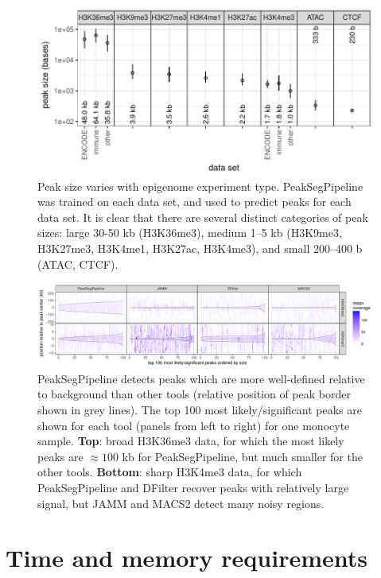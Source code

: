 \documentclass{article}
\begin{document}
\begin{figure}
  \centering
  \includegraphics[width=\textwidth]{figure-compare-size-panels.pdf}
  \vskip -0.5cm
  \caption{Peak size varies with epigenome experiment
    type. PeakSegPipeline was trained on each data set, and used to
    predict peaks for each data set. It is clear that there are
    several distinct categories of peak sizes: large 30-50 kb
    (H3K36me3), medium 1--5 kb (H3K9me3, H3K27me3, H3K4me1, H3K27ac,
    H3K4me3), and small 200--400 b (ATAC, CTCF).}
\end{figure}

\begin{figure}
  \centering
  \includegraphics[width=\textwidth]{figure-top100-absolute.pdf}
  \vskip -0.5cm
  \caption{PeakSegPipeline detects peaks which are more well-defined
    relative to background than other tools (relative position of peak
    border shown in grey lines). The top 100 most likely/significant
    peaks are shown for each tool (panels from left to right) for one
    monocyte sample.  \textbf{Top}: broad H3K36me3 data, for which the
    most likely peaks are $\approx 100$ kb for PeakSegPipeline, but
    much smaller for the other tools. \textbf{Bottom}: sharp H3K4me3
    data, for which PeakSegPipeline and DFilter recover peaks with
    relatively large signal, but JAMM and MACS2 detect many noisy
    regions.}
\end{figure}

\section{Time and memory requirements}
\end{document}
